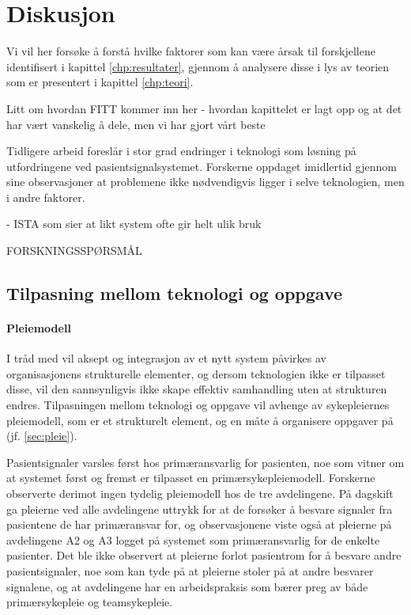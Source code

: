 \chapter{Diskusjon}
\label{chp:diskusjon}

Vi vil her forsøke å forstå hvilke faktorer som kan være årsak til forskjellene identifisert i kapittel \ref{chp:resultater}, gjennom å analysere disse i lys av teorien som er presentert i kapittel \ref{chp:teori}. 

Litt om hvordan FITT kommer inn her - hvordan kapittelet er lagt opp og at det har vært vanskelig å dele, men vi har gjort vårt beste

\noindent
Tidligere arbeid foreslår i stor grad endringer i teknologi som løsning på utfordringene ved pasientsignalsystemet. Forskerne oppdaget imidlertid gjennom sine observasjoner at problemene ikke nødvendigvis ligger i selve teknologien, men i andre faktorer. 

- ISTA som sier at likt system ofte gir helt ulik bruk

FORSKNINGSSPØRSMÅL

\section{Tilpasning mellom teknologi og oppgave}	

\subsubsection{Pleiemodell}	
I tråd med \citet{Orlikowski92} vil aksept og integrasjon av et nytt system påvirkes av organisasjonens strukturelle elementer, og dersom teknologien ikke er tilpasset disse, vil den sannsynligvis ikke skape effektiv samhandling uten at strukturen endres. 
Tilpasningen mellom teknologi og oppgave vil avhenge av sykepleiernes pleiemodell, som er et strukturelt element, og en måte å organisere oppgaver på (jf. \ref{sec:pleie}).

\noindent
Pasientsignaler varsles først hos primæransvarlig for pasienten, noe som vitner om at systemet først og fremst er tilpasset en primærsykepleiemodell. Forskerne observerte derimot ingen tydelig pleiemodell hos de tre avdelingene. På dagskift ga pleierne ved alle avdelingene uttrykk for at de forsøker å besvare signaler fra pasientene de har primæransvar for, og observasjonene viste også at pleierne på avdelingene A2 og A3 logget på systemet som primæransvarlig for de enkelte pasienter. Det ble ikke observert at pleierne forlot pasientrom for å besvare andre pasientsignaler, noe som kan tyde på at pleierne stoler på at andre besvarer signalene, og at avdelingene har en arbeidspraksis som bærer preg av både primærsykepleie og teamsykepleie.

